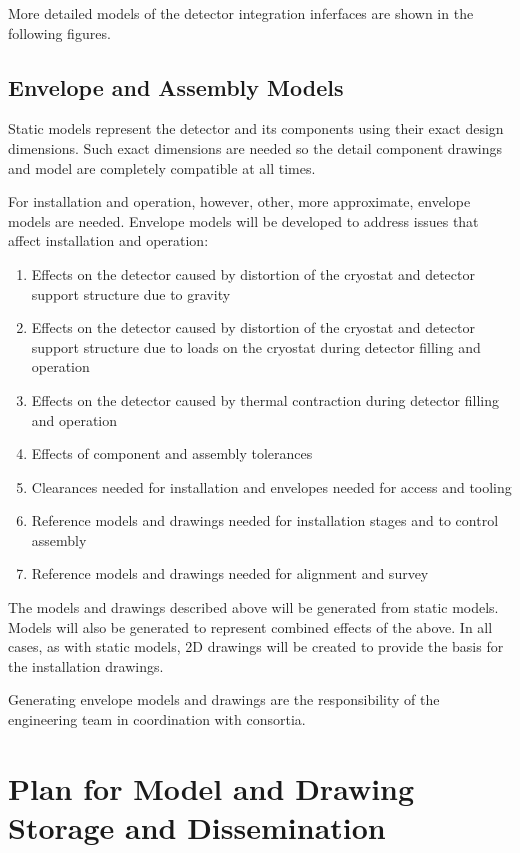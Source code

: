 More detailed models of the  detector integration
inferfaces are shown in the following figures.


\subsection{Envelope and Assembly Models}
\label{sec:fdsp-coord-integ-envelope}

Static models represent the detector and its components using their exact
design dimensions. Such exact dimensions are needed so the
detail component drawings and model are completely compatible at all
times.


For installation and operation, however, other, more approximate, envelope models are needed. Envelope models will be developed
to address issues that affect installation and operation:
\begin{enumerate}
 \item Effects on the detector caused by distortion of the cryostat
   and detector support structure due to gravity
 \item Effects on the detector caused by distortion of the cryostat
   and detector support structure due to loads on the cryostat during detector filling and operation
 \item Effects on the detector caused by thermal contraction during
   detector filling and operation
 \item Effects of component and
   assembly tolerances
 \item Clearances needed for installation and envelopes needed for
   access and tooling
 \item Reference models and drawings needed for installation stages
   and to control assembly
 \item Reference models and drawings needed for alignment and survey
\end{enumerate}


The models and drawings described above will be generated from static
models. Models will also be generated to
represent combined effects of the above. In all cases, as with static models, 2D
drawings will be created to provide the basis for the installation
drawings.


Generating envelope models and drawings are the responsibility of the
 engineering team in coordination with consortia.




\section{Plan for Model and Drawing Storage and Dissemination}
\label{sec:fdsp-coord-integ-modelplan}

